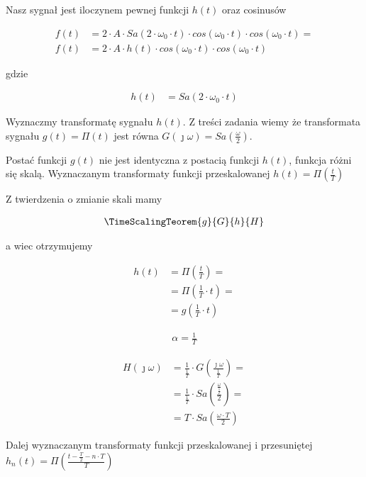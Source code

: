 \begin{task}
Nasz sygnał jest iloczynem pewnej funkcji $h(t)$ oraz cosinusów

\begin{align*}
f(t)&=2 \cdot A \cdot Sa\left(2 \cdot \omega_0 \cdot t\right) \cdot cos\left(\omega_0 \cdot t\right) \cdot cos\left(\omega_0 \cdot t\right) = \\
f(t)&=2 \cdot A \cdot h(t) \cdot cos\left(\omega_0 \cdot t\right) \cdot cos\left(\omega_0 \cdot t\right)
\end{align*}

gdzie

\begin{align*}
h(t)&= Sa\left(2 \cdot \omega_0 \cdot t\right)
\end{align*}

Wyznaczmy transformatę sygnału $h(t)$. Z treści zadania wiemy że transformata sygnału $g(t)=\Pi\left(t\right)$ jest równa $G(\jmath\omega)=Sa\left(\frac{\omega}{2}\right)$. 

Postać funkcji $g(t)$ nie jest identyczna z postacią funkcji $h(t)$, funkcja różni się skalą. 
Wyznaczanym transformaty funkcji przeskalowanej $h(t)=\Pi\left(\frac{t}{T}\right)$

Z twierdzenia o zmianie skali mamy 

\begin{align*}
\TimeScalingTeorem{g}{G}{h}{H}
\end{align*}

a wiec otrzymujemy

\begin{align*}
h(t) &= \Pi\left(\frac{t}{T}\right)=\\
&=\Pi\left(\frac{1}{T}\cdot t\right)=\\
&=g\left(\frac{1}{T}\cdot t\right)
\end{align*}

\begin{align*}
\alpha=\frac{1}{T}
\end{align*}

\begin{align*}
H(\jmath \omega)&=\frac{1}{\frac{1}{T}} \cdot G\left(\frac{\jmath \omega}{\frac{1}{T}}\right)=\\
&=\frac{1}{\frac{1}{T}} \cdot Sa\left(\frac{\frac{\omega}{\frac{1}{T}}}{2}\right)=\\
&=T \cdot Sa\left(\frac{\omega \cdot T}{2}\right)
\end{align*}

Dalej wyznaczanym transformaty funkcji przeskalowanej i przesuniętej $h_n(t)=\Pi\left(\frac{t - \frac{T}{2} -n\cdot T }{T}\right)$


\end{task}
